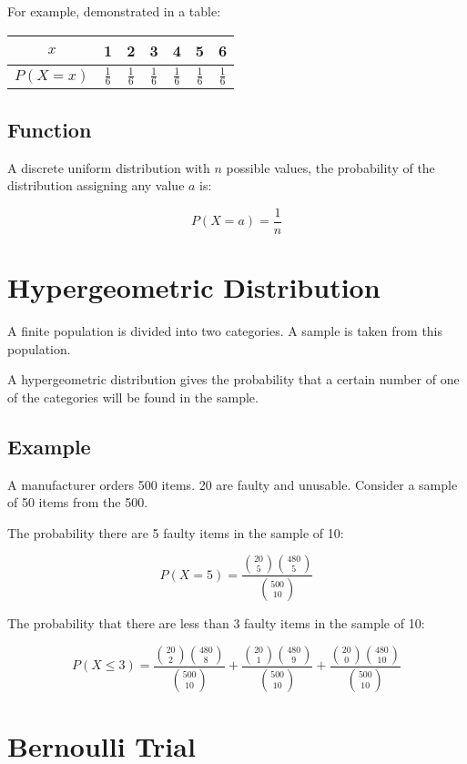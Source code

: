 \documentclass[a4paper,11pt]{article}
\begin{document}
For example, demonstrated in a table:

\begin{center}
\begin{tabular}{c|c|c|c|c|c|c}
$x$ & 1 & 2 & 3 & 4 & 5 & 6 \\
\hline
$P(X = x)$ & $\frac{1}{6}$ & $\frac{1}{6}$ & $\frac{1}{6}$ & $\frac{1}{6}$ & $\frac{1}{6}$ & $\frac{1}{6}$ \\
\end{tabular}
\end{center}


\subsection{Function}

A discrete uniform distribution with $n$ possible values, the probability of
the distribution assigning any value $a$ is:

$$
P(X = a) = \frac{1}{n}
$$




\section{Hypergeometric Distribution}

A finite population is divided into two categories. A sample is taken from this
population.

A hypergeometric distribution gives the probability that a certain number of
one of the categories will be found in the sample.


\subsection{Example}

A manufacturer orders 500 items. 20 are faulty and unusable. Consider a sample
of 50 items from the 500.

The probability there are 5 faulty items in the sample of 10:

$$
P(X = 5) = \frac{\binom{20}{5} \binom{480}{5}}{\binom{500}{10}}
$$

The probability that there are less than 3 faulty items in the sample of 10:

$$
P(X \leq 3) = \frac{\binom{20}{2} \binom{480}{8}}{\binom{500}{10}} +
\frac{\binom{20}{1} \binom{480}{9}}{\binom{500}{10}} +
\frac{\binom{20}{0} \binom{480}{10}}{\binom{500}{10}}
$$




\section{Bernoulli Trial}
\end{document}
